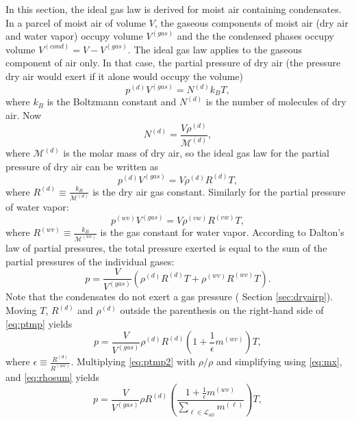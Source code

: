 \documentclass{agujournal}
\begin{document}
{In this section, the ideal gas law is derived for moist air containing condensates. In a parcel of moist air
of volume $V$, the gaseous components of moist air (dry air and water vapor) occupy volume $V^{(gas)}$ and the the condensed phases occupy volume $V^{(cond)}=V-V^{(gas)}$. The ideal gas law applies to the gaseous component of air only. In that case, the partial pressure of dry air (the pressure dry air would exert if it alone would occupy the volume)
\begin{equation}
p^{(d)}V^{(gas)}=N^{(d)}k_B T,
\end{equation}
where $k_B$ is the Boltzmann constant and $N^{(d)}$ is the number of molecules of dry air. Now
\begin{equation}
N^{(d)}=\frac{V \rho^{(d)}}{\mathcal{M}^{(d)}},
\end{equation}
where $\mathcal{M}^{(d)}$ is the molar mass of dry air, so the ideal gas law for the partial pressure of dry air can be written as
\begin{equation}
p^{(d)}V^{(gas)}=V\rho^{(d)}R^{(d)}T,
\end{equation}
where $R^{(d)}\equiv \frac{k_B}{\mathcal{M}^{(d)}}$ is the dry air gas constant. Similarly for the partial pressure of water vapor:
\begin{equation}
p^{(wv)}V^{(gas)}=V\rho^{(vw)}R^{(vw)}T,
\end{equation}
where $R^{(wv)}\equiv \frac{k_B}{\mathcal{M}^{(wv)}}$ is the gas constant for water vapor. According to Dalton's law of partial pressures, the total pressure exerted is equal to the sum of the partial pressures of the individual gases:
\begin{equation}
\label{eq:ptmp}
p=\frac{V}{V^{(gas)}}\left( \rho^{(d)}R^{(d)}T+\rho^{(wv)}R^{(wv)}T\right).
\end{equation}
Note that the condensates do not exert a gas pressure ({\color{red}{see}} Section \ref{sec:dryairp}). Moving $T$, $R^{(d)}$ and $\rho^{(d)}$ outside the parenthesis on the right-hand side of \eqref{eq:ptmp} yields
\begin{equation}
\label{eq:ptmp2}
p=\frac{V}{V^{(gas)}}\rho^{(d)}R^{(d)}\left( 1+\frac{1}{\epsilon}m^{(wv)}\right)T,
\end{equation}
where $\epsilon\equiv \frac{R^{(d)}}{R^{(wv)}}$. Multiplying \eqref{eq:ptmp2} with $\rho/\rho$ and simplifying using \eqref{eq:mx}, and \eqref{eq:rhosum} yields
\begin{equation}
\label{eq:ptmp3}
p=\frac{V}{V^{(gas)}}\rho R^{(d)}\left(\frac{ 1+\frac{1}{\epsilon}m^{(wv)}}{\sum_{\ell \in \mathcal{L}_{all}}m^{(\ell)}}\right)T,

\end{equation}}
\end{document}
